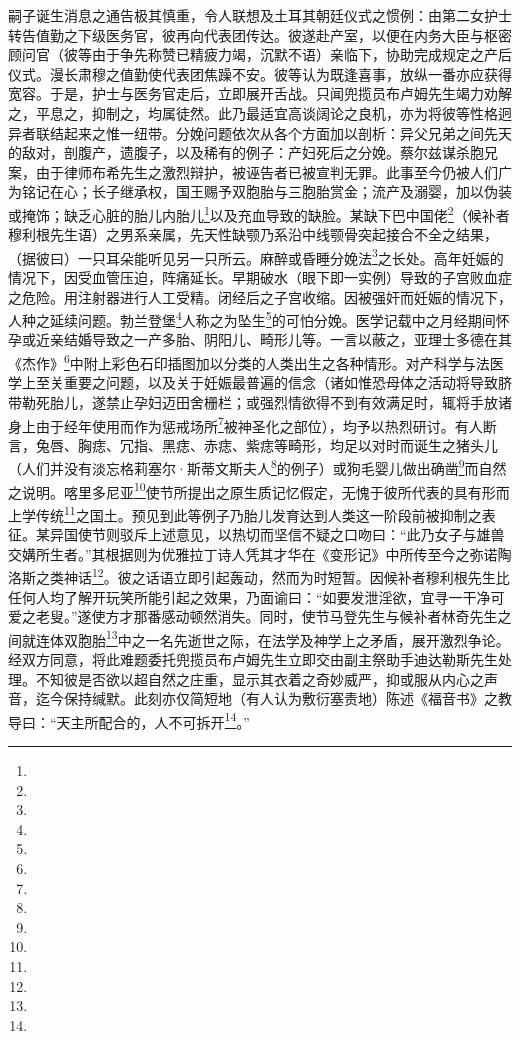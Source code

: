 \par 嗣子诞生消息之通告极其慎重，令人联想及土耳其朝廷仪式之惯例：由第二女护士转告值勤之下级医务官，彼再向代表团传达。彼遂赴产室，以便在内务大臣与枢密顾问官（彼等由于争先称赞已精疲力竭，沉默不语）亲临下，协助完成规定之产后仪式。漫长肃穆之值勤使代表团焦躁不安。彼等认为既逢喜事，放纵一番亦应获得宽容。于是，护士与医务官走后，立即展开舌战。只闻兜揽员布卢姆先生竭力劝解之，平息之，抑制之，均属徒然。此乃最适宜高谈阔论之良机，亦为将彼等性格迥异者联结起来之惟一纽带。分娩问题依次从各个方面加以剖析：异父兄弟之间先天的敌对，剖腹产，遗腹子，以及稀有的例子：产妇死后之分娩。蔡尔兹谋杀胞兄案，由于律师布希先生之激烈辩护，被诬告者已被宣判无罪。此事至今仍被人们广为铭记在心；长子继承权，国王赐予双胞胎与三胞胎赏金；流产及溺婴，加以伪装或掩饰；缺乏心脏的胎儿内胎儿\footnote{}以及充血导致的缺脸。某缺下巴中国佬\footnote{}（候补者穆利根先生语）之男系亲属，先天性缺颚乃系沿中线颚骨突起接合不全之结果，（据彼曰）一只耳朵能听见另一只所云。麻醉或昏睡分娩法\footnote{}之长处。高年妊娠的情况下，因受血管压迫，阵痛延长。早期破水（眼下即一实例）导致的子宫败血症之危险。用注射器进行人工受精。闭经后之子宫收缩。因被强奸而妊娠的情况下，人种之延续问题。勃兰登堡\footnote{}人称之为坠生\footnote{}的可怕分娩。医学记载中之月经期间怀孕或近亲结婚导致之一产多胎、阴阳儿、畸形儿等。一言以蔽之，亚理士多德在其《杰作》\footnote{}中附上彩色石印插图加以分类的人类出生之各种情形。对产科学与法医学上至关重要之问题，以及关于妊娠最普遍的信念（诸如惟恐母体之活动将导致脐带勒死胎儿，遂禁止孕妇迈田舍栅栏；或强烈情欲得不到有效满足时，辄将手放诸身上由于经年使用而作为惩戒场所\footnote{}被神圣化之部位），均予以热烈研讨。有人断言，兔唇、胸痣、冗指、黑痣、赤痣、紫痣等畸形，均足以对时而诞生之猪头儿（人们并没有淡忘格莉塞尔·斯蒂文斯夫人\footnote{}的例子）或狗毛婴儿做出确凿\footnote{}而自然之说明。喀里多尼亚\footnote{}使节所提出之原生质记忆假定，无愧于彼所代表的具有形而上学传统\footnote{}之国土。预见到此等例子乃胎儿发育达到人类这一阶段前被抑制之表征。某异国使节则驳斥上述意见，以热切而坚信不疑之口吻曰：“此乃女子与雄兽交媾所生者。”其根据则为优雅拉丁诗人凭其才华在《变形记》中所传至今之弥诺陶洛斯之类神话\footnote{}。彼之话语立即引起轰动，然而为时短暂。因候补者穆利根先生比任何人均了解开玩笑所能引起之效果，乃面谕曰：“如要发泄淫欲，宜寻一干净可爱之老叟。”遂使方才那番感动顿然消失。同时，使节马登先生与候补者林奇先生之间就连体双胞胎\footnote{}中之一名先逝世之际，在法学及神学上之矛盾，展开激烈争论。经双方同意，将此难题委托兜揽员布卢姆先生立即交由副主祭助手迪达勒斯先生处理。不知彼是否欲以超自然之庄重，显示其衣着之奇妙威严，抑或服从内心之声音，迄今保持缄默。此刻亦仅简短地（有人认为敷衍塞责地）陈述《福音书》之教导曰：“天主所配合的，人不可拆开\footnote{}。”

